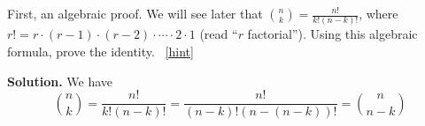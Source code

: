\documentclass{book}
\begin{document}
\setcounter{project}{72}
\addtocounter{project}{-1}
\begin{activity}[]\label{activity-65}
\hypertarget{p-580}{}%
First, an algebraic proof.  We will see later that \(\binom{n}{k} = \frac{n!}{k!(n-k)!}\), where \(r! = r \cdot (r-1) \cdot (r-2) \cdot\cdots\cdot 2\cdot 1\) (read ``\(r\) factorial'').  Using this algebraic formula, prove the identity.%
~\hfill{\tiny\hyperlink{a-72}{[hint]}\hypertarget{q-72}{}}\par\smallskip%
\noindent\textbf{Solution.}\hypertarget{solution-54}{}\quad%
\hypertarget{p-582}{}%
We have%
\begin{equation*}
\binom{n}{k} = \frac{n!}{k!(n-k)!} = \frac{n!}{(n-k)!(n-(n-k))!} = \binom{n}{n-k}
\end{equation*}
%
\end{activity}
\end{document}

